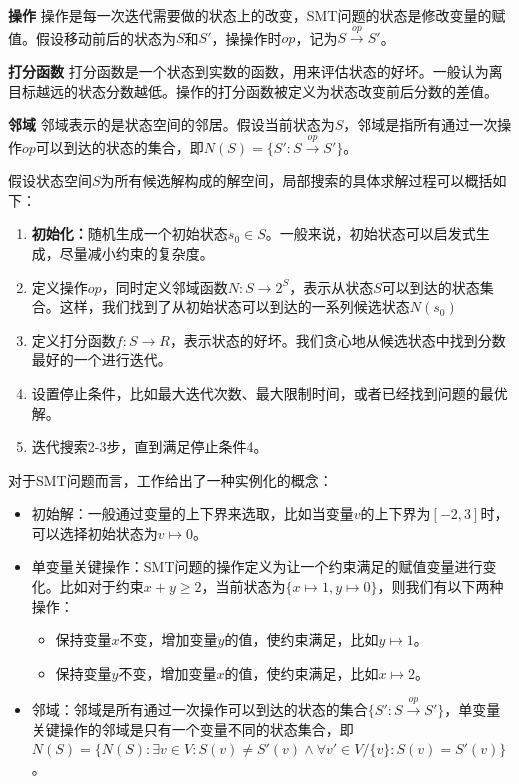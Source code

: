 \begin{definition}{\textbf{操作}}
操作是每一次迭代需要做的状态上的改变，SMT问题的状态是修改变量的赋值。假设移动前后的状态为$S$和$S'$，操操作时$op$，记为$S \xrightarrow{op} S'$。
\end{definition}

\begin{definition}{\textbf{打分函数}}
打分函数是一个状态到实数的函数，用来评估状态的好坏。一般认为离目标越远的状态分数越低。操作的打分函数被定义为状态改变前后分数的差值。
\end{definition}

\begin{definition}{\textbf{邻域}}
邻域表示的是状态空间的邻居。假设当前状态为$S$，邻域是指所有通过一次操作$op$可以到达的状态的集合，即$N(S) = \{S' : S \xrightarrow{op} S'\}$。
\end{definition}

假设状态空间$S$为所有候选解构成的解空间，局部搜索的具体求解过程可以概括如下：
\begin{enumerate}
    \item \textbf{初始化：}随机生成一个初始状态$s_0 \in S$。一般来说，初始状态可以启发式生成，尽量减小约束的复杂度。
    \item 定义操作$op$，同时定义邻域函数$N: S \rightarrow 2^S$，表示从状态$S$可以到达的状态集合。这样，我们找到了从初始状态可以到达的一系列候选状态$N(s_0)$
    \item 定义打分函数$f: S \rightarrow R$，表示状态的好坏。我们贪心地从候选状态中找到分数最好的一个进行迭代。
    \item 设置停止条件，比如最大迭代次数、最大限制时间，或者已经找到问题的最优解。
    \item 迭代搜索2-3步，直到满足停止条件4。
\end{enumerate}
对于SMT问题而言，工作\cite{CaiLZ2023}给出了一种实例化的概念：
\begin{itemize}
    \item 初始解：一般通过变量的上下界来选取，比如当变量$v$的上下界为$[-2, 3]$时，可以选择初始状态为$v \mapsto 0$。
    \item 单变量关键操作：SMT问题的操作定义为让一个约束满足的赋值变量进行变化。比如对于约束$x + y \geq 2$，当前状态为$\{x \mapsto 1, y \mapsto 0\}$，则我们有以下两种操作：
    \begin{itemize}
        \item 保持变量$x$不变，增加变量$y$的值，使约束满足，比如$y \mapsto 1$。
        \item 保持变量$y$不变，增加变量$x$的值，使约束满足，比如$x \mapsto 2$。
    \end{itemize}

    \item 邻域：邻域是所有通过一次操作可以到达的状态的集合$\{S' : S \xrightarrow{op} S'\}$，单变量关键操作的邻域是只有一个变量不同的状态集合，即$N(S) = \{N(S): \exists v \in V: S(v) \neq S'(v) \land \forall v' \in V / \{v\}: S(v) = S'(v) \}$。
\end{itemize}

